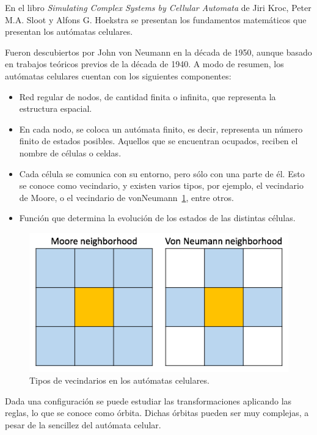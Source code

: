 En el libro \textit{Simulating Complex Systems by Cellular Automata} de Jiri Kroc, Peter M.A. Sloot y Alfons G. Hoekstra
\cite{cellular-automata} se presentan los fundamentos matemáticos que presentan los autómatas celulares.

Fueron descubiertos por John von Neumann en la década de 1950, aunque basado en trabajos teóricos previos de la
década de 1940. A modo de resumen, los autómatas celulares cuentan con los siguientes componentes:

\begin{itemize}
    \item Red regular de nodos, de cantidad finita o infinita, que representa la estructura espacial.
    \item En cada nodo, se coloca un autómata finito, es decir, representa un número finito de estados posibles.
    Aquellos que se encuentran ocupados, reciben el nombre de células o celdas.
    \item Cada célula se comunica con su entorno, pero sólo con una parte de él. Esto se conoce como vecindario,
    y existen varios tipos, por ejemplo, el vecindario de Moore, o el vecindario de vonNeumann~\ref{fig:neighboor}, entre otros.
    \item Función que determina la evolución de los estados de las distintas células.
\end{itemize}

\begin{figure}[h]
\centering
\includegraphics[scale=0.6]{figures/automata_neighboor}
\caption{Tipos de vecindarios en los autómatas celulares.}
\label{fig:neighboor}
\end{figure}

Dada una configuración se puede estudiar las transformaciones aplicando las reglas,
lo que se conoce como órbita. Dichas órbitas pueden ser muy complejas, a pesar de
la sencillez del autómata celular.

